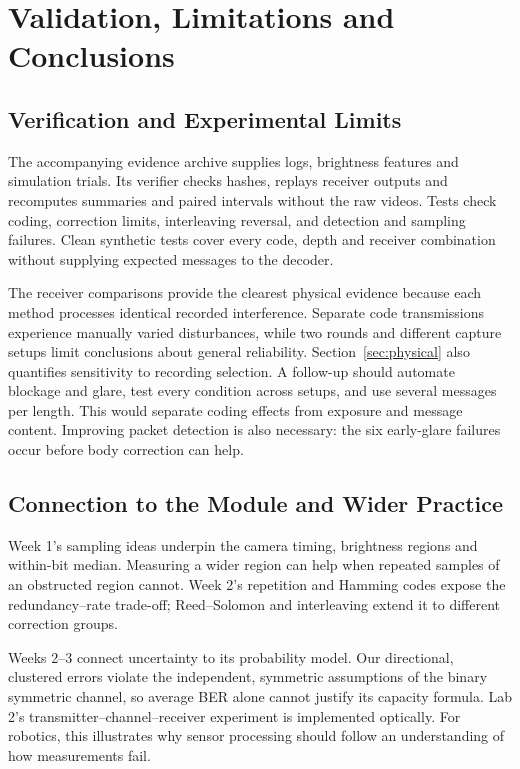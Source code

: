 \documentclass[conference,a4paper]{IEEEtran}
\begin{document}
\section{Validation, Limitations and Conclusions}
\label{sec:conclusions}
\subsection{Verification and Experimental Limits}
The accompanying evidence archive supplies logs, brightness features and
simulation trials. Its verifier checks hashes, replays receiver outputs
and recomputes summaries and paired intervals without the raw videos. Tests check coding, correction limits, interleaving reversal,
and detection and sampling failures. Clean synthetic tests cover every
code, depth and receiver combination without supplying expected messages
to the decoder.


The receiver comparisons provide the clearest physical evidence because
each method processes identical recorded interference. Separate code
transmissions experience manually varied disturbances, while two rounds
and different capture setups limit conclusions about general reliability.
Section~\ref{sec:physical} also quantifies sensitivity to recording selection.
A follow-up should automate blockage and glare, test every condition across
setups, and use several messages per length. This would separate coding
effects from exposure and message content. Improving packet detection is
also necessary: the six early-glare failures occur before body correction
can help.

\balance
\subsection{Connection to the Module and Wider Practice}
Week 1's sampling ideas underpin the camera timing, brightness regions
and within-bit median. Measuring a wider region can help when repeated
samples of an obstructed region cannot. Week 2's repetition and Hamming
codes expose the redundancy--rate trade-off; Reed--Solomon and interleaving
extend it to different correction groups.

Weeks 2--3 connect uncertainty to its probability model. Our directional,
clustered errors violate the independent, symmetric assumptions of the
binary symmetric channel, so average BER alone cannot justify its capacity
formula. Lab 2's transmitter--channel--receiver experiment is implemented
optically. For robotics, this illustrates why sensor processing should
follow an understanding of how measurements fail.
\end{document}
